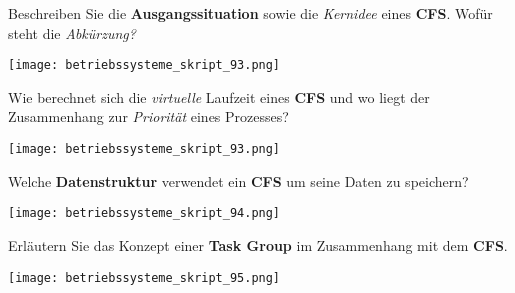 \documentclass{article}
\begin{document}
\begin{tcolorbox}[colback=white!10!white,colframe=lightgray!75!black,
  savelowerto=\jobname_ex.tex,breakable,enhanced,lines before break=40]

\justifying
Beschreiben Sie die \textbf{Ausgangssituation} sowie die \textit{Kernidee} eines \textbf{CFS}. Wofür steht die \textit{Abkürzung?}

\tcblower

\justifying
\begin{center}
\texttt{[image: betriebssysteme\_skript\_93.png]}
\end{center}

\end{tcolorbox}
\begin{tcolorbox}[colback=white!10!white,colframe=lightgray!75!black,
  savelowerto=\jobname_ex.tex,breakable,enhanced,lines before break=40]

\justifying
Wie berechnet sich die \textit{virtuelle} Laufzeit eines \textbf{CFS} und wo liegt der Zusammenhang zur \textit{Priorität} eines Prozesses?

\tcblower

\justifying
\begin{center}
\texttt{[image: betriebssysteme\_skript\_93.png]}
\end{center}

\end{tcolorbox}
\begin{tcolorbox}[colback=white!10!white,colframe=lightgray!75!black,
  savelowerto=\jobname_ex.tex,breakable,enhanced,lines before break=40]

\justifying
Welche \textbf{Datenstruktur} verwendet ein \textbf{CFS} um seine Daten zu speichern?

\tcblower

\justifying
\begin{center}
\texttt{[image: betriebssysteme\_skript\_94.png]}
\end{center}

\end{tcolorbox}
\begin{tcolorbox}[colback=white!10!white,colframe=lightgray!75!black,
  savelowerto=\jobname_ex.tex,breakable,enhanced,lines before break=40]

\justifying
Erläutern Sie das Konzept einer \textbf{Task Group} im Zusammenhang mit dem \textbf{CFS}.

\tcblower

\justifying
\begin{center}
\texttt{[image: betriebssysteme\_skript\_95.png]}
\end{center}

\end{tcolorbox}
\end{document}
